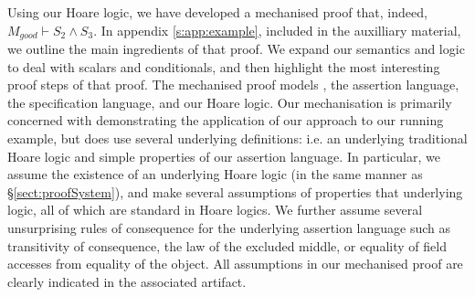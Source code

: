 Using our Hoare logic, we have developed a mechanised proof that, indeed, $M_{good} \vdash S_2 \wedge S_3$.
In appendix \ref{s:app:example}, included in the auxilliary material, we outline the main ingredients of that proof. 
We  expand our  semantics and logic to deal with scalars and conditionals, %
and then highlight the most interesting proof steps of that proof.
The mechanised proof models \LangOO, the assertion language, the specification language, and our Hoare logic. 
Our mechanisation is primarily concerned with demonstrating the application of our approach to our running example, 
but does use several underlying definitions: i.e. an underlying traditional Hoare logic and simple properties of our 
assertion language. In particular, we assume the existence of an underlying Hoare logic (in the same manner as \S \ref{sect:proofSystem}), 
and make several assumptions of properties that underlying logic, all of which are standard in Hoare logics. 
We further assume several unsurprising rules of consequence for the underlying assertion language such as 
transitivity of consequence, the law of the excluded middle, or equality of field accesses from equality of the object.
All assumptions in our mechanised proof are clearly indicated in the associated artifact.


